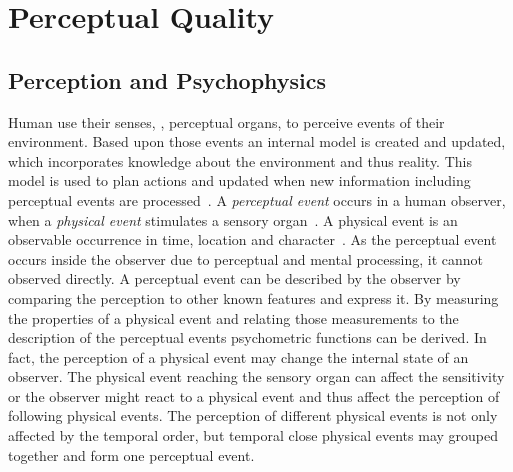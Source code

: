 \chapter{Perceptual Quality}\label{chap:02}

\section{Perception and Psychophysics}
Human use their senses, \ie, perceptual organs, to perceive events of their environment.
Based upon those events an internal model is created and updated, which incorporates knowledge about the environment and thus reality.
This model is used to plan actions and updated when new information including perceptual events are processed~\citep[p. 4]{blauert_spatial_1996}.
A \emph{perceptual event} occurs in a human observer, when a \emph{physical event} stimulates a sensory organ~\citep{blauert_spatial_1996}.
A physical event is an observable occurrence in time, location and character~\citep{callet_qualinet_2013}.
As the perceptual event occurs inside the observer due to perceptual and mental processing, it cannot observed directly.
A perceptual event can be described by the observer by comparing the perception to other known features and express it.
By measuring the properties of a physical event and relating those measurements to the description of the perceptual events psychometric functions can be derived.
In fact, the perception of a physical event may change the internal state of an observer.
The physical event reaching the sensory organ can affect the sensitivity or the observer might react to a physical event and thus affect the perception of following physical events.
The perception of different physical events is not only affected by the temporal order, but temporal close physical events may grouped together and form one perceptual event.

